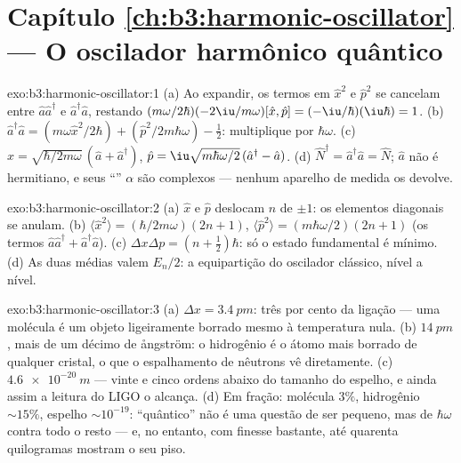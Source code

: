\section*{Capítulo \ref{ch:b3:harmonic-oscillator} --- O oscilador harmônico quântico}

\begin{solution}{exo:b3:harmonic-oscillator:1}
(a) Ao expandir, os termos em $\hat x^2$ e $\hat p^2$ se cancelam entre
$\hat a\hat a^\dagger$ e $\hat a^\dagger\hat a$, restando
$(m\omega/2\hbar)(-2\iu/m\omega)[\hat x, \hat p] =
(-\iu/\hbar)(\iu\hbar) = 1$. (b) $\hat a^\dagger\hat a = (m\omega\hat x^2/2\hbar) +
(\hat p^2/2m\hbar\omega) - \tfrac12$: multiplique por $\hbar\omega$. (c)
$\hat x = \sqrt{\hbar/2m\omega}\,(\hat a + \hat a^\dagger)$, $\hat p
= \iu\sqrt{m\hbar\omega/2}\,(\hat a^\dagger - \hat a)$. (d) $\hat
N^\dagger = \hat a^\dagger\hat a = \hat N$; $\hat a$ não é hermitiano,
e seus ``'' $\alpha$ são complexos --- nenhum aparelho de
medida os devolve.
\end{solution}

\begin{solution}{exo:b3:harmonic-oscillator:2}
(a) $\hat x$ e $\hat p$ deslocam $n$ de $\pm1$: os elementos diagonais
se anulam. (b) $\langle\hat x^2\rangle = (\hbar/2m\omega)(2n + 1)$,
$\langle\hat p^2\rangle = (m\hbar\omega/2)(2n + 1)$ (os termos $\hat
a\hat a^\dagger + \hat a^\dagger\hat a$). (c) $\Delta x\Delta p
= (n + \tfrac12)\hbar$: só o estado fundamental é mínimo. (d) As duas
médias valem $E_n/2$: a equipartição do oscilador clássico, nível a
nível.
\end{solution}

\begin{solution}{exo:b3:harmonic-oscillator:3}
(a) $\Delta x = \qty{3.4}{pm}$: três por cento da ligação --- uma
molécula é um objeto ligeiramente borrado mesmo à temperatura nula. (b)
$\qty{14}{pm}$, mais de um décimo de ångström: o hidrogênio é o átomo
mais borrado de qualquer cristal, o que o espalhamento de nêutrons vê
diretamente. (c) $\qty{4.6e-20}{m}$ --- vinte e cinco ordens abaixo do
tamanho do espelho, e ainda assim a leitura do LIGO o alcança. (d) Em
fração: molécula $3\%$, hidrogênio $\sim15\%$, espelho
$\sim10^{-19}$: ``quântico'' não é uma questão de ser pequeno, mas de
$\hbar\omega$ contra todo o resto --- e, no entanto, com finesse
bastante, até quarenta quilogramas mostram o seu piso.
\end{solution}

